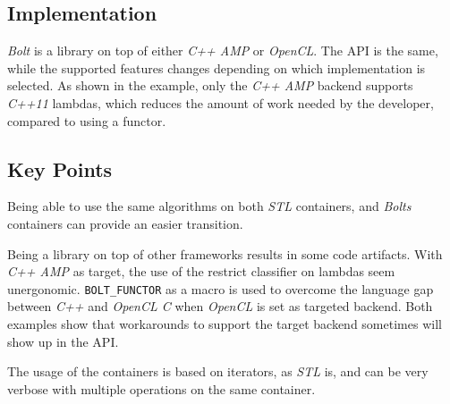 \subsection{Implementation}
\textit{Bolt} is a library on top of either \textit{C++ AMP} or \textit{OpenCL}\cite{boltPresentation}. The API is the same, while the supported features changes depending on which implementation is selected.
As shown in the example, only the \textit{C++ AMP} backend supports \textit{C++11} lambdas, which reduces the amount of work needed by the developer, compared to using a functor.

\subsection{Key Points}
Being able to use the same algorithms on both \textit{STL} containers, and \textit{Bolts} containers can provide an easier transition.

Being a library on top of other frameworks results in some code artifacts. With \textit{C++ AMP} as target, the use of the restrict classifier on lambdas seem unergonomic. \texttt{BOLT\_FUNCTOR} as a macro is used to overcome the language gap between \textit{C++} and \textit{OpenCL C} when \textit{OpenCL} is set as targeted backend. Both examples show that workarounds to support the target backend sometimes will show up in the API. 

The usage of the containers is based on iterators, as \textit{STL} is, and can be very verbose with multiple operations on the same container.
